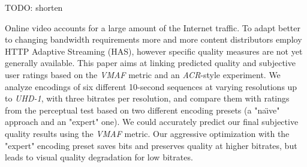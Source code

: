 TODO: shorten

Online video accounts for a large amount of the Internet traffic. To adapt better to changing bandwidth requirements more and more content distributors employ HTTP Adaptive Streaming (HAS), however specific quality measures are not yet generally available. This paper aims at linking predicted quality and subjective user ratings based on the \textit{VMAF} metric and an \textit{ACR}-style experiment. We analyze encodings of six different 10-second sequences at varying resolutions up to \textit{UHD-1}, with three bitrates per resolution, and compare them with ratings from the perceptual test based on two different encoding presets (a "na\"{\i}ve" approach and an "expert" one). We could accurately predict our final subjective quality results using the \textit{VMAF} metric. Our aggressive optimization with the "expert" encoding preset saves bits and preserves quality at higher bitrates, but leads to visual quality degradation for low bitrates.
